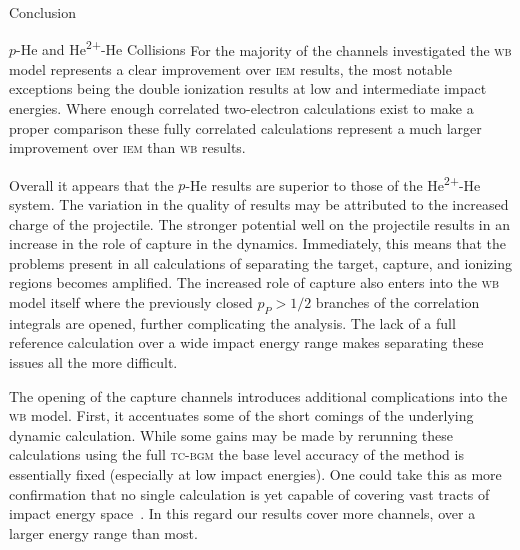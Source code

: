\documentclass[letterpaper, 11 pt]{report}
\begin{document}
\begin{chapter}{Conclusion \label{chap:con}}
\begin{section}{\texorpdfstring{$p$}{p}-He and \texorpdfstring{He\textsuperscript{2+}}{He2+}-He
                   Collisions \label{sec:con-phe2p-he}}
      For the majority of the channels investigated the \textsc{wb} model represents a clear improvement
      over \textsc{iem}  results, the most notable exceptions being the double ionization results at low
      and intermediate impact energies. Where enough correlated two-electron calculations exist to make
      a proper comparison these fully correlated calculations represent a much larger improvement over
      \textsc{iem} than \textsc{wb} results.

      Overall it appears that the $p$-He results are superior to those of the He\textsuperscript{2+}-He
      system. The variation in the quality of results may be attributed to the increased charge of the
      projectile. The stronger potential well on the projectile results in an increase in the role of
      capture in the dynamics. Immediately, this means that the problems present in all calculations of
      separating the target, capture, and ionizing regions becomes amplified. The increased role of
      capture also enters into the \textsc{wb} model itself where the previously closed $p_P > 1/2$
      branches of the correlation integrals are opened, further complicating the analysis. The lack of a
      full reference calculation over a wide impact energy range makes separating these issues all the
      more difficult.

      The opening of the capture channels introduces additional complications into the \textsc{wb}
      model. First, it accentuates some of the short comings of the underlying dynamic calculation.
      While some gains may be made by rerunning these calculations using the full \textsc{tc-bgm} the
      base level accuracy of the method is essentially fixed (especially at low impact energies). One
      could take this as more confirmation that no single calculation is yet capable of covering vast
      tracts of impact energy space~\cite{LRV-14}. In this regard our results cover more channels, over
      a larger energy range than most.


\end{section}
\end{chapter}
\end{document}
